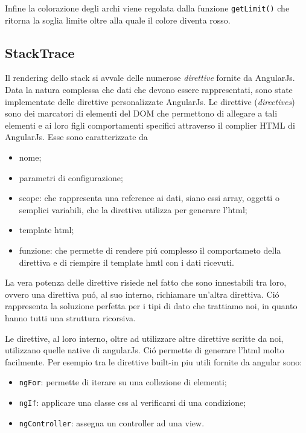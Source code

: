Infine la colorazione degli archi viene regolata dalla funzione \texttt{getLimit()} che ritorna la soglia limite oltre alla quale il colore diventa rosso. 


\subsection{StackTrace} 
Il rendering dello stack si avvale delle numerose \emph{direttive} fornite da 
AngularJs. \\Data la natura complessa che dati che devono essere rappresentati, sono state 
implementate delle direttive personalizzate AngularJs. 
Le direttive (\emph{directives}) sono dei marcatori di elementi del DOM che permettono di allegare 
a tali elementi e ai loro figli comportamenti specifici attraverso il complier 
HTML di AngularJs. Esse sono  caratterizzate da 
\begin{itemize} 
	\item nome;
	\item parametri di configurazione;
	\item scope:  che rappresenta una reference ai dati, siano essi array, oggetti o 
	semplici variabili, che la direttiva utilizza per generare l'html;
	\item template html;
	\item funzione: che permette di rendere piú complesso il comportameto della direttiva
	e di riempire il template hmtl con i dati ricevuti.
\end{itemize} 

La vera potenza delle direttive risiede nel fatto che sono innestabili tra loro, 
ovvero una direttiva puó, al suo interno, richiamare un'altra direttiva. Ció 
rappresenta la soluzione perfetta per i tipi di dato che trattiamo noi, in quanto 
hanno tutti una struttura ricorsiva. 

Le direttive, al loro interno, oltre ad utilizzare altre direttive scritte da noi, 
utilizzano quelle native di angularJs. Ció permette di generare l'html molto 
facilmente. Per esempio tra le direttive built-in piu utili fornite da angular sono: 
\begin{itemize} 
	\item \texttt{ngFor}: permette di iterare su una collezione di elementi;
	\item \texttt{ngIf}: applicare una classe css al verificarsi di una condizione; 
	\item \texttt{ngController}: assegna un controller ad una view.
\end{itemize} 

